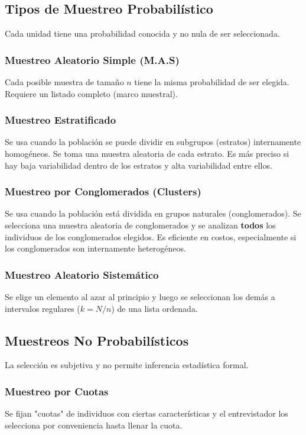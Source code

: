 \documentclass[12pt, letterpaper]{article}
\begin{document}
\subsection{Tipos de Muestreo Probabilístico}
Cada unidad tiene una probabilidad conocida y no nula de ser seleccionada.

\subsubsection{Muestreo Aleatorio Simple (M.A.S)}
Cada posible muestra de tamaño $n$ tiene la misma probabilidad de ser elegida. Requiere un listado completo (marco muestral).

\subsubsection{Muestreo Estratificado}
Se usa cuando la población se puede dividir en subgrupos (estratos) internamente homogéneos. Se toma una muestra aleatoria de cada estrato. Es más preciso si hay baja variabilidad dentro de los estratos y alta variabilidad entre ellos.

\subsubsection{Muestreo por Conglomerados (Clusters)}
Se usa cuando la población está dividida en grupos naturales (conglomerados). Se selecciona una muestra aleatoria de conglomerados y se analizan \textbf{todos} los individuos de los conglomerados elegidos. Es eficiente en costos, especialmente si los conglomerados son internamente heterogéneos.

\subsubsection{Muestreo Aleatorio Sistemático}
Se elige un elemento al azar al principio y luego se seleccionan los demás a intervalos regulares ($k=N/n$) de una lista ordenada.

\subsection{Muestreos No Probabilísticos}
La selección es subjetiva y no permite inferencia estadística formal.

\subsubsection{Muestreo por Cuotas}
Se fijan "cuotas" de individuos con ciertas características y el entrevistador los selecciona por conveniencia hasta llenar la cuota.
\end{document}
